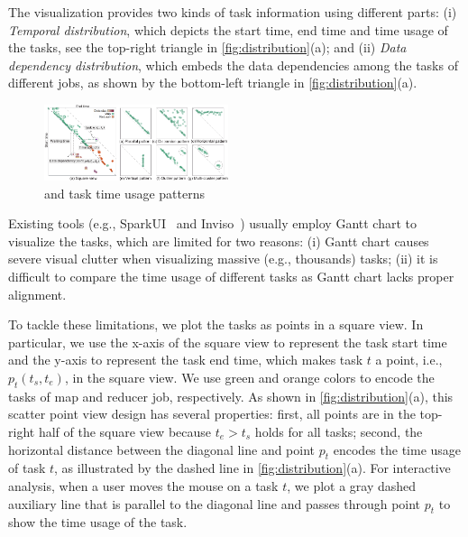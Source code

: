 The visualization provides two kinds of task information using different parts: (i) \textit{Temporal distribution}, which depicts the start time, end time and time usage of the tasks, see the top-right triangle in \autoref{fig:distribution}(a); and (ii) \textit{Data dependency distribution}, which embeds the data dependencies among the tasks of different jobs, as shown by the bottom-left triangle in \autoref{fig:distribution}(a).



\begin{figure}
	\centering
	\small
	\includegraphics[width=0.48\textwidth]{figures/visualization/distributionview_revision.pdf}
	\vspace{-2mm}
	\caption{ and task time usage patterns}
	\label{fig:distribution}
	\vspace{-6mm}
\end{figure}

Existing tools (e.g., SparkUI~\cite{sparkui} and Inviso~\cite{inviso}) usually employ Gantt chart to visualize the tasks, which are limited for two reasons: (i) Gantt chart causes severe visual clutter when visualizing massive (e.g., thousands) tasks; (ii) it is difficult to compare the time usage of different tasks as Gantt chart lacks proper alignment. 

To tackle these limitations, we plot the tasks as points in a square view.
In particular, we use the x-axis of the square view to represent the task start time and the y-axis to represent the task end time, which makes task $t$ a point, i.e., $p_t(t_s, t_e)$, in the square view. 
We use green and orange colors to encode the tasks of map and reducer job, respectively.
As shown in \autoref{fig:distribution}(a), this scatter point view design has several properties:
first, all points are in the top-right half of the square view because $t_e > t_s$ holds for all tasks;
second, the horizontal distance between the diagonal line and point $p_t$ encodes the time usage of task $t$, as illustrated by the dashed line in \autoref{fig:distribution}(a).
For interactive analysis, when a user moves the mouse on a task $t$, we plot a gray dashed auxiliary line that is parallel to the diagonal line and passes through point $p_t$ to show the time usage of the task. 

